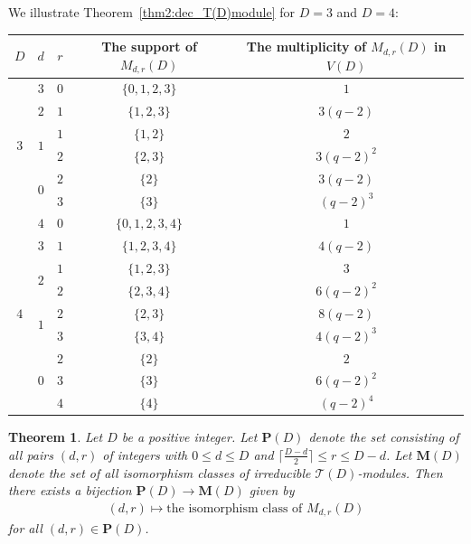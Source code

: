 \documentclass[10pt,a4paper]{amsart}
\def\T{\mathcal T}
\numberwithin{equation}{section}
\newtheorem{Theorem}{Theorem}[section]
\begin{document}
We illustrate Theorem~\ref{thm2:dec_T(D)module} for $D=3$ and $D=4$:
\begin{table}[h!]
\centering
\extrarowheight=3pt
\begin{tabular}{c|c|c|c|c}
\toprule
$D$ &$d$ &$r$ &The support of $M_{d,r}(D)$ &The multiplicity of $M_{d,r}(D)$ in $V(D)$
\\
\midrule
\multirow{6}{*}{$3$} &$3$ &$0$ &$\{0,1,2,3\}$ &$1$
\\
\cline{2-5}
 &$2$ &$1$ &$\{1,2,3\}$ &$3(q-2)$
\\
\cline{2-5}
 &\multirow{2}{*}{$1$} &$1$ &$\{1,2\}$ &$2$
\\
\cline{3-5}
 & &$2$ &$\{2,3\}$ &$3(q-2)^2$
\\
\cline{2-5}
 &\multirow{2}{*}{$0$} &$2$ &$\{2\}$ &$3(q-2)$
 \\
\cline{3-5}
 & &$3$ &$\{3\}$ &$(q-2)^3$
 \\
 \midrule
%
\multirow{9}{*}{$4$} &$4$ &$0$ &$\{0,1,2,3,4\}$ &$1$
\\
\cline{2-5}
 &$3$ &$1$ &$\{1,2,3,4\}$ &$4(q-2)$
\\
\cline{2-5}
 &\multirow{2}{*}{$2$} &$1$ &$\{1,2,3\}$ &$3$
\\
\cline{3-5}
 & &$2$ &$\{2,3,4\}$ &$6(q-2)^2$
\\
\cline{2-5}
 &\multirow{2}{*}{$1$} &$2$ &$\{2,3\}$ &$8(q-2)$
 \\
\cline{3-5}
 & &$3$ &$\{3,4\}$ &$4(q-2)^3$
 \\
 \cline{2-5}
 &\multirow{3}{*}{$0$} &$2$ &$\{2\}$ &$2$
 \\
 \cline{3-5}
 & &$3$ &$\{3\}$ &$6(q-2)^2$
 \\
 \cline{3-5}
 & &$4$ &$\{4\}$ &$(q-2)^4$
 \\
 \bottomrule
\end{tabular}
\end{table}

\begin{Theorem}\label{thm2:T(D)irrmodule}
Let $D$ be a positive integer. Let $\mathbf P(D)$ denote the set consisting of all pairs $(d,r)$ of integers with $0\leq d\leq D$ and $\big\lceil \frac{D-d}{2}\big\rceil\leq r\leq D-d$. Let $\mathbf M(D)$ denote the set of all isomorphism classes of irreducible $\T(D)$-modules. Then there exists a bijection $\mathbf P(D)\to \mathbf M(D)$ given by
\begin{gather*}
(d,r) \mapsto \text{the isomorphism class of $M_{d,r}(D)$}
\end{gather*}
for all $(d,r)\in \mathbf P(D)$.
\end{Theorem}
\end{document}
